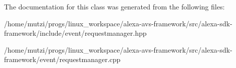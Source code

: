 The documentation for this class was generated from the following files\+:\begin{DoxyCompactItemize}
\item 
/home/mutzi/progs/linux\+\_\+workspace/alexa-\/avs-\/framework/src/alexa-\/sdk-\/framework/include/event/requestmanager.\+hpp\item 
/home/mutzi/progs/linux\+\_\+workspace/alexa-\/avs-\/framework/src/alexa-\/sdk-\/framework/event/requestmanager.\+cpp\end{DoxyCompactItemize}
